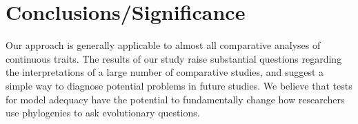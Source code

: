 \documentclass[a4paper,12pt]{article}
\begin{document}
\section*{Conclusions/Significance}

Our approach is generally applicable to almost all comparative analyses of continuous traits. The results of our study raise substantial questions regarding the interpretations of a large number of comparative studies, and suggest a simple way to diagnose potential problems in future studies. We believe that tests for model adequacy have the potential to fundamentally change how researchers use phylogenies to ask evolutionary questions. 



\end{document}

